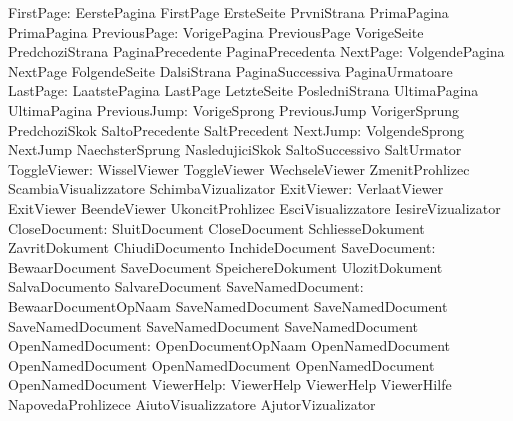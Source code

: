                 FirstPage: EerstePagina              FirstPage
                           ErsteSeite                PrvniStrana
                           PrimaPagina               PrimaPagina
             PreviousPage: VorigePagina              PreviousPage
                           VorigeSeite               PredchoziStrana
                           PaginaPrecedente          PaginaPrecedenta
                 NextPage: VolgendePagina            NextPage
                           FolgendeSeite             DalsiStrana
                           PaginaSuccessiva          PaginaUrmatoare
                 LastPage: LaatstePagina             LastPage
                           LetzteSeite               PosledniStrana
                           UltimaPagina              UltimaPagina
             PreviousJump: VorigeSprong              PreviousJump
                           VorigerSprung             PredchoziSkok
                           SaltoPrecedente           SaltPrecedent
                 NextJump: VolgendeSprong            NextJump
                           NaechsterSprung           NasledujiciSkok
                           SaltoSuccessivo           SaltUrmator
             ToggleViewer: WisselViewer              ToggleViewer
                           WechseleViewer            ZmenitProhlizec
                           ScambiaVisualizzatore     SchimbaVizualizator
               ExitViewer: VerlaatViewer             ExitViewer
                           BeendeViewer              UkoncitProhlizec
                           EsciVisualizzatore        IesireVizualizator
            CloseDocument: SluitDocument             CloseDocument
                           SchliesseDokument         ZavritDokument
                           ChiudiDocumento           InchideDocument
             SaveDocument: BewaarDocument            SaveDocument
                           SpeichereDokument         UlozitDokument
                           SalvaDocumento            SalvareDocument
        SaveNamedDocument: BewaarDocumentOpNaam      SaveNamedDocument
                           SaveNamedDocument         SaveNamedDocument
                           SaveNamedDocument         SaveNamedDocument
        OpenNamedDocument: OpenDocumentOpNaam        OpenNamedDocument
                           OpenNamedDocument         OpenNamedDocument
                           OpenNamedDocument         OpenNamedDocument
               ViewerHelp: ViewerHelp                ViewerHelp
                           ViewerHilfe               NapovedaProhlizece
                           AiutoVisualizzatore       AjutorVizualizator
